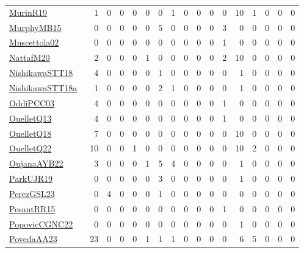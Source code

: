 {\begin{longtable}{l*{16}{r}}
\href{papers/MurinR19.pdf}{MurinR19}~\cite{MurinR19} & 1 & 0 & 0 & 0 & 0 & 0 & 1 & 0 & 0 & 0 & 0 & 10 & 1 & 0 & 0 & 0\\
\href{papers/MurphyMB15.pdf}{MurphyMB15}~\cite{MurphyMB15} & 0 & 0 & 0 & 0 & 0 & 5 & 0 & 0 & 0 & 0 & 3 & 0 & 0 & 0 & 0 & 0\\
\href{papers/Muscettola02.pdf}{Muscettola02}~\cite{Muscettola02} & 0 & 0 & 0 & 0 & 0 & 0 & 0 & 0 & 0 & 0 & 1 & 0 & 0 & 0 & 0 & 0\\
\href{papers/NattafM20.pdf}{NattafM20}~\cite{NattafM20} & 2 & 0 & 0 & 0 & 1 & 0 & 0 & 0 & 0 & 0 & 2 & 10 & 0 & 0 & 0 & 0\\
\href{papers/NishikawaSTT18.pdf}{NishikawaSTT18}~\cite{NishikawaSTT18} & 4 & 0 & 0 & 0 & 0 & 1 & 0 & 0 & 0 & 0 & 0 & 1 & 0 & 0 & 0 & 0\\
\href{papers/NishikawaSTT18a.pdf}{NishikawaSTT18a}~\cite{NishikawaSTT18a} & 1 & 0 & 0 & 0 & 0 & 2 & 1 & 0 & 0 & 0 & 0 & 1 & 0 & 0 & 0 & 0\\
\href{papers/OddiPCC03.pdf}{OddiPCC03}~\cite{OddiPCC03} & 4 & 0 & 0 & 0 & 0 & 0 & 0 & 0 & 0 & 0 & 1 & 0 & 0 & 0 & 0 & 0\\
\href{papers/OuelletQ13.pdf}{OuelletQ13}~\cite{OuelletQ13} & 4 & 0 & 0 & 0 & 0 & 0 & 0 & 0 & 0 & 0 & 1 & 0 & 0 & 0 & 0 & 0\\
\href{papers/OuelletQ18.pdf}{OuelletQ18}~\cite{OuelletQ18} & 7 & 0 & 0 & 0 & 0 & 0 & 0 & 0 & 0 & 0 & 0 & 10 & 0 & 0 & 0 & 0\\
\href{papers/OuelletQ22.pdf}{OuelletQ22}~\cite{OuelletQ22} & 10 & 0 & 0 & 1 & 0 & 0 & 0 & 0 & 0 & 0 & 0 & 10 & 2 & 0 & 0 & 0\\
\href{papers/OujanaAYB22.pdf}{OujanaAYB22}~\cite{OujanaAYB22} & 3 & 0 & 0 & 0 & 1 & 5 & 4 & 0 & 0 & 0 & 0 & 1 & 0 & 0 & 0 & 0\\
\href{papers/ParkUJR19.pdf}{ParkUJR19}~\cite{ParkUJR19} & 0 & 0 & 0 & 0 & 0 & 3 & 0 & 0 & 0 & 0 & 0 & 1 & 0 & 0 & 0 & 0\\
\href{papers/PerezGSL23.pdf}{PerezGSL23}~\cite{PerezGSL23} & 0 & 4 & 0 & 0 & 0 & 1 & 0 & 0 & 0 & 0 & 0 & 0 & 0 & 0 & 0 & 0\\
\href{papers/PesantRR15.pdf}{PesantRR15}~\cite{PesantRR15} & 0 & 0 & 0 & 0 & 0 & 0 & 0 & 0 & 0 & 0 & 1 & 0 & 0 & 0 & 0 & 0\\
\href{papers/PopovicCGNC22.pdf}{PopovicCGNC22}~\cite{PopovicCGNC22} & 0 & 0 & 0 & 0 & 0 & 0 & 0 & 0 & 0 & 0 & 0 & 1 & 0 & 0 & 0 & 0\\
\href{papers/PovedaAA23.pdf}{PovedaAA23}~\cite{PovedaAA23} & 23 & 0 & 0 & 0 & 1 & 1 & 1 & 0 & 0 & 0 & 0 & 6 & 5 & 0 & 0 & 0\\

\end{longtable}}
